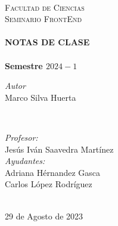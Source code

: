 \begin{titlepage}
\quad \\[1.5cm]
\textsc{\Large Facultad de Ciencias}\\[0.5cm] %
\textsc{\Large Seminario FrontEnd}\\[0.5cm] %
\makeatletter
    \HRule\\ [0.4cm]
        { \huge \bfseries NOTAS DE CLASE}\\
    \HRule\\ [0.4cm]
\large\textbf{Semestre $2024-1$}\\
\vspace{20mm}
\begin{minipage}{0.4\textwidth}
    \begin{flushright} \large
    \centering
        \emph{\large Autor} \\ %
        \vspace{3mm}
        \Large Marco Silva Huerta\\
    \end{flushright}
\end{minipage}\\[1.3cm]
\vspace{10mm}
\begin{minipage}{0.7\textwidth}
    \begin{flushleft} \large
        \emph{Profesor:}\\
            Jesús Iván Saavedra Martínez \\
            \vspace{3mm}
            \emph{Ayudantes:}\\
            Adriana Hérnandez Gasca \\
            Carlos López Rodríguez
    \end{flushleft}
\end{minipage}\\[1.9cm]
\makeatother
{\large 29 de Agosto de 2023}\\[2cm]
\vfill 
\end{titlepage}